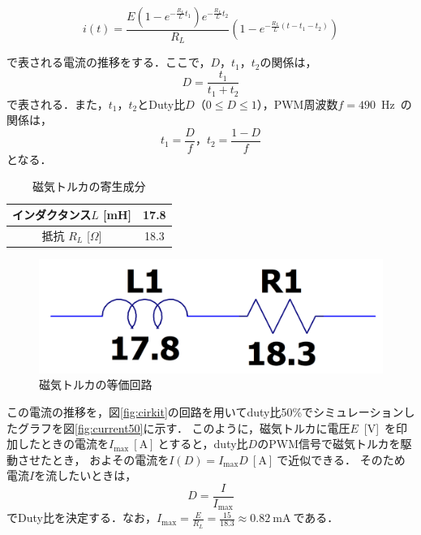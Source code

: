 \begin{equation}
	i(t) = \frac{E\left(1-e^{-\frac{R_L}{L}t_1}\right)e^{-\frac{R_L}{L}t_2}}{R_L}\left(1-e^{-\frac{R_L}{L}(t-t_1-t_2)}\right)
\end{equation}

で表される電流の推移をする．ここで，$D，t_1，t_2$の関係は，
\begin{equation}
	D = \frac{t_1}{t_1+t_2}
\end{equation}
で表される．また，$t_1，t_2$とDuty比$D$（$0\leq D\leq1$），PWM周波数$f=490$~Hz~の関係は，
\begin{equation}
	t_1 = \frac{D}{f}，t_2 = \frac{1-D}{f}
\end{equation}
となる．

\begin{table}[H]
	\centering
	\caption{磁気トルカの寄生成分}
	\label{table:torquer2}
	\begin{tabular}{|c||c|}
		\hline
		インダクタンス$L$ [mH] & 17.8 \\ \hline
		抵抗 $R_L$ [$\Omega $] & 18.3 \\ \hline 
	\end{tabular}
\end{table}

\begin{figure}[H]
	\centering
		\includegraphics[scale=0.15]{./figure/touka.png}
		\caption{磁気トルカの等価回路}
		\label{fig:touka}
\end{figure}

この電流の推移を，図\ref{fig:cirkit}の回路を用いてduty比50\%でシミュレーションしたグラフを図\ref{fig:current50}に示す．
このように，磁気トルカに電圧$E$~[V]~を印加したときの電流を$I_\mathrm{max}~[\mathrm{A}]~$とすると，duty比$D$のPWM信号で磁気トルカを駆動させたとき，
およその電流を$I(D)=I_\mathrm{max}D~[\mathrm{A}]~$で近似できる． 
そのため電流$I$を流したいときは，
\begin{equation}
	D=\frac{I}{I_\mathrm{max}}
\end{equation}
でDuty比を決定する．なお，$I_\mathrm{max}=\frac{E}{R_L}=\frac{15}{18.3}\approx0.82~\mathrm{mA}~$である．


